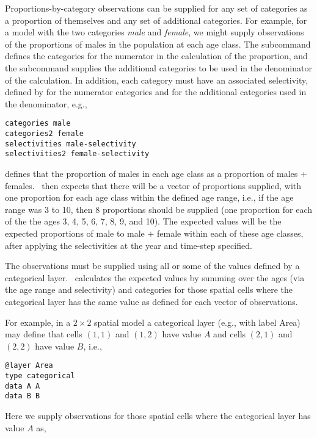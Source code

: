 {{{{{{Proportions-by-category observations can be supplied for any set of categories as a proportion of themselves and any set of additional categories. For example, for a model with the two categories \emph{male} and \emph{female}, we might supply observations of the proportions of males in the population at each age class. The subcommand  defines the categories for the numerator in the calculation of the proportion, and the subcommand  supplies the additional categories to be used in the denominator of the calculation. In addition, each category must have an associated selectivity, defined by  for the numerator categories and  for the additional categories used in the denominator, e.g., 

{\small{\begin{verbatim}
categories male
categories2 female
selectivities male-selectivity
selectivities2 female-selectivity
\end{verbatim}}}

defines that the proportion of males in each age class as a proportion of males $+$ females. \SPM\ then expects that there will be a vector of proportions supplied, with one proportion for each age class within the defined age range, i.e., if the age range was 3 to 10, then 8 proportions should be supplied (one proportion for each of the the ages 3, 4, 5, 6, 7, 8, 9, and 10). The expected values will be the expected proportions of male to male $+$ female within each of these age classes, after applying the selectivities at the year and time-step specified. 

The observations must be supplied using all or some of the values defined by a categorical layer. \SPM\ calculates the expected values by summing over the ages (via the age range and selectivity) and categories for those spatial cells where the categorical layer has the same value as defined for each vector of observations.

For example, in a $2 \times 2$ spatial model a categorical layer (e.g., with label Area) may define that cells $(1,1)$ and $(1,2)$ have value $A$ and cells $(2,1)$ and $(2,2)$ have value $B$, i.e.,

{\small{\begin{verbatim}
@layer Area
type categorical
data A A 
data B B
\end{verbatim}}}

Here we supply observations for those spatial cells where the categorical layer has value $A$ as, 

}}}}}}
